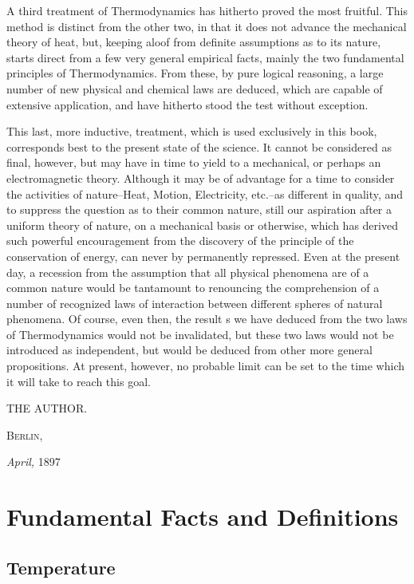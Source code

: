 \documentclass[oneside,12pt]{book}
\newcommand{\iit}[1]{\textit{#1}}
\begin{document}
A third treatment of Thermodynamics has hitherto proved the most fruitful. This method is distinct from the other two, in that it does not advance the mechanical theory of heat, but, keeping aloof from definite assumptions as to its nature, starts direct from a few very general empirical facts, mainly the two fundamental principles of Thermodynamics. From these, by pure logical reasoning, a large number of new physical and chemical laws are deduced, which are capable of extensive application, and have hitherto stood the test without exception. \par

This last, more inductive, treatment, which is used exclusively in this book, corresponds best to the present state of the science. It cannot be considered as final, however, but may have in time to yield to a mechanical, or perhaps an electromagnetic theory. Although it may be of advantage for a time to consider the activities of nature--Heat, Motion, Electricity, etc.--as different in quality, and to suppress the question as to their common nature, still our aspiration after a uniform theory of nature, on a mechanical basis or otherwise, which has derived such powerful encouragement from the discovery of the principle of the conservation of energy, can never by permanently repressed. Even at the present day, a recession from the assumption that all physical phenomena are of a common nature would be tantamount to renouncing the comprehension of a number of recognized laws of interaction between different spheres of natural phenomena. Of course, even then, the result s we have deduced from the two laws of Thermodynamics would not be invalidated, but these two laws would not be introduced as independent, but would be deduced from other more general propositions. At present, however, no probable limit can be set to the time which it will take to reach this goal. \par
\begin{flushright}
    \uppercase{The Author.}
\end{flushright}
\textsc{Berlin,} \par
\iit{April,} 1897

\tableofcontents

\mainmatter
\part{Fundamental Facts and Definitions}
\chapter{Temperature}
\end{document}
